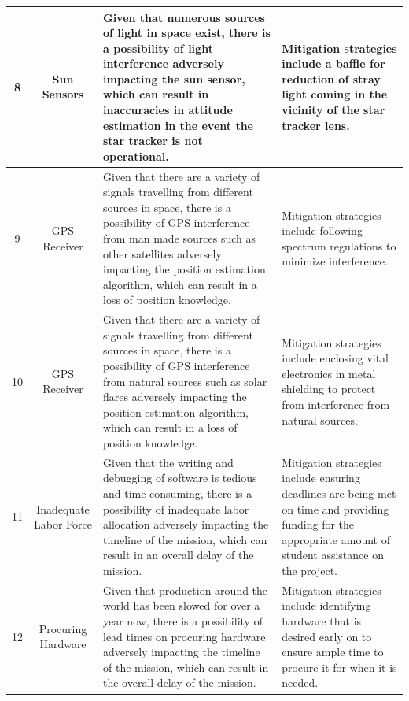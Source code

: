 \documentclass[conf]{new-aiaa}
\begin{document}
\begin{center}
\begin{longtable}[c]{|c|c|p{4.0cm}<{\centering}|p{4.0cm}<{\centering}|}
\rowcolor{lightgray} 8  &  Sun Sensors & Given that numerous sources of light in space exist, there is a possibility of light interference adversely impacting the sun sensor, which can result in inaccuracies in attitude estimation in the event the star tracker is not operational. & Mitigation strategies include a baffle for reduction of stray light coming in the vicinity of the star tracker lens. \\ \hline 
9  &  GPS Receiver & Given that there are a variety of signals travelling from different sources in space, there is a possibility of GPS interference from man made sources such as other satellites adversely impacting the position estimation algorithm, which can result in a loss of position knowledge. & Mitigation strategies include following spectrum regulations to minimize interference. \\ \hline 
\rowcolor{lightgray} 10 &  GPS Receiver & Given that there are a variety of signals travelling from different sources in space, there is a possibility of GPS interference from natural sources such as solar flares adversely impacting the position estimation algorithm, which can result in a loss of position knowledge. & Mitigation strategies include enclosing vital electronics in metal shielding to protect from interference from natural sources. \\ \hline 
11 &  Inadequate Labor Force & Given that the writing and debugging of software is tedious and time consuming, there is a possibility of inadequate labor allocation adversely impacting the timeline of the mission, which can result in an overall delay of the mission. & Mitigation strategies include ensuring deadlines are being met on time and providing funding for the appropriate amount of student assistance on the project. \\ \hline 
\rowcolor{lightgray} 12 &  Procuring Hardware & Given that production around the world has been slowed for over a year now, there is a possibility of lead times on procuring hardware adversely impacting the timeline of the mission, which can result in the overall delay of the mission. & Mitigation strategies include identifying hardware that is desired early on to ensure ample time to procure it for when it is needed. \\
\end{longtable}
\end{center}
\end{document}
